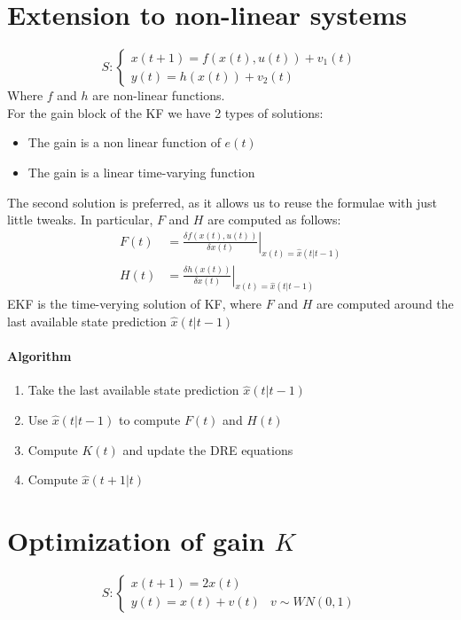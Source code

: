 \documentclass{article}
\begin{document}
\section{Extension to non-linear systems}
\[
S:
\begin{cases}
x(t+1)=f(x(t),u(t))+v_1(t)\\
y(t)=h(x(t))+v_2(t)
\end{cases}
\]
Where $f$ and $h$ are non-linear functions.\\
For the gain block of the KF we have 2 types of solutions:
\begin{itemize}
\item The gain is a non linear function of $e(t)$
\item The gain is a linear time-varying function
\end{itemize}
The second solution is preferred, as it allows us to reuse the formulae with just little tweaks. In particular, $F$ and $H$ are computed as follows:
\begin{align*}
F(t)&=\left.\frac{\delta f(x(t),u(t))}{\delta x(t)}\right\vert_{x(t)=\hat{x}(t|t-1)}\\
H(t)&=\left.\frac{\delta h(x(t))}{\delta x(t)}\right\vert_{x(t)=\hat{x}(t|t-1)}
\end{align*}
EKF is the time-verying solution of KF, where $F$ and $H$ are computed around the last available state prediction $\hat{x}(t|t-1)$
\paragraph{Algorithm}
\begin{enumerate}
\item Take the last available state prediction $\hat{x}(t|t-1)$
\item Use $\hat{x}(t|t-1)$ to compute $F(t)$ and $H(t)$
\item Compute $K(t)$ and update the DRE equations
\item Compute $\hat{x}(t+1|t)$
\end{enumerate}

\section{Optimization of gain $K$}
\[
S:
\begin{cases}
x(t+1)=2x(t)\\
y(t)=x(t)+v(t)&v\sim WN(0,1)
\end{cases}
\]
\end{document}
